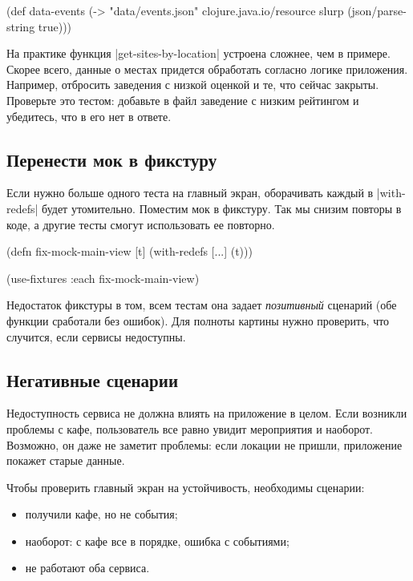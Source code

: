 \begin{english}
  \begin{clojure}
(def data-events
  (-> "data/events.json"
      clojure.java.io/resource
      slurp
      (json/parse-string true)))
  \end{clojure}
\end{english}

На практике функция \spverb|get-sites-by-location| устроена сложнее, чем в
примере. Скорее всего, данные о местах придется обработать согласно логике
приложения. Например, отбросить заведения с низкой оценкой и те, что сейчас
закрыты. Проверьте это тестом: добавьте в файл заведение с низким рейтингом и
убедитесь, что в его нет в ответе.

\subsection{Перенести мок в фикстуру}

Если нужно больше одного теста на главный экран, оборачивать каждый в
\spverb|with-redefs| будет утомительно. Поместим мок в фикстуру. Так мы снизим
повторы в коде, а другие тесты смогут использовать ее повторно.

\begin{english}
  \begin{clojure}
(defn fix-mock-main-view [t]
  (with-redefs [...]
    (t)))

(use-fixtures :each fix-mock-main-view)
  \end{clojure}
\end{english}

Недостаток фикстуры в том, всем тестам она задает \emph{позитивный} сценарий
(обе функции сработали без ошибок). Для полноты картины нужно проверить, что
случится, если сервисы недоступны.

\subsection{Негативные сценарии}

Недоступность сервиса не должна влиять на приложение в целом. Если возникли
проблемы с кафе, пользователь все равно увидит мероприятия и наоборот. Возможно,
он даже не заметит проблемы: если локации не пришли, приложение покажет старые
данные.

Чтобы проверить главный экран на устойчивость, необходимы сценарии:

\begin{itemize}

\item
  получили кафе, но не события;

\item
  наоборот: с кафе все в порядке, ошибка с событиями;

\item
  не работают оба сервиса.

\end{itemize}

